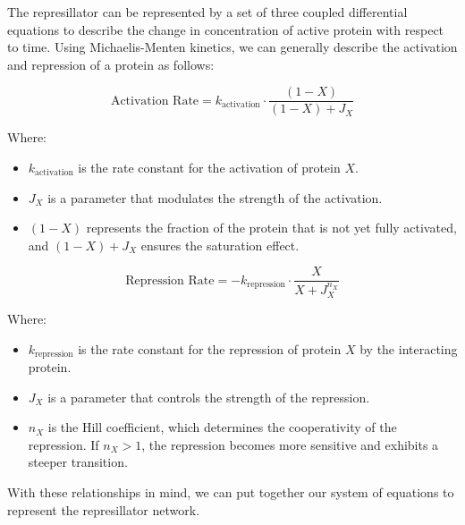 \documentclass{article}
\begin{document}
The represillator can be represented by a set of three coupled differential equations to describe the change in concentration of active protein with respect to time. Using Michaelis-Menten kinetics, we can generally describe the activation and repression of a protein as follows:

\[
\text{Activation Rate} = k_{\text{activation}} \cdot \frac{(1 - X)}{(1 - X) + J_X}
\]

Where:
\begin{itemize}
    \item \( k_{\text{activation}} \) is the rate constant for the activation of protein \( X \).
    \item \( J_X \) is a parameter that modulates the strength of the activation.
    \item\( (1 - X) \) represents the fraction of the protein that is not yet fully activated, and \( (1 - X) + J_X \) ensures the saturation effect.
\end{itemize}

\[
\text{Repression Rate} = - k_{\text{repression}} \cdot \frac{X}{X + J_X^{n_X}}
\]

Where:
\begin{itemize}
    \item \( k_{\text{repression}} \) is the rate constant for the repression of protein \( X \) by the interacting protein.
    \item \( J_X \) is a parameter that controls the strength of the repression.
    \item \( n_X \) is the Hill coefficient, which determines the cooperativity of the repression. If \( n_X > 1 \), the repression becomes more sensitive and exhibits a steeper transition.
\end{itemize}

With these relationships in mind, we can put together our system of equations to represent the represillator network. 
\end{document}
